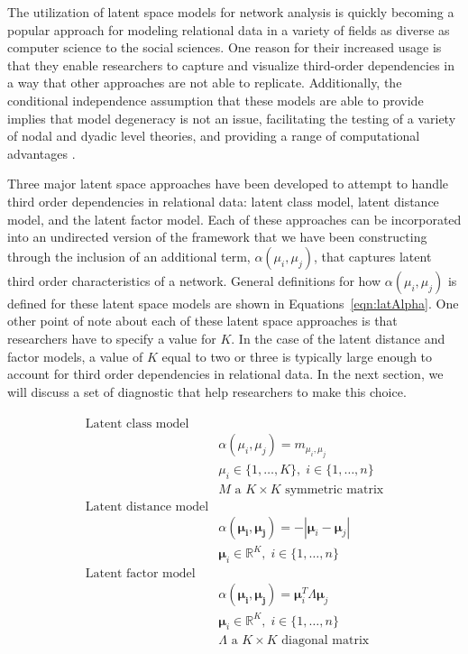 The utilization of latent space models for network analysis is quickly becoming a popular approach for modeling relational data in a variety of fields as diverse as computer science to the social sciences. One   reason for their increased usage is that they enable researchers to capture and visualize third-order dependencies in a way that other approaches are not able to replicate. Additionally, the conditional independence assumption that these models are able to provide implies that model degeneracy is not an issue, facilitating the testing of a variety of nodal and dyadic level theories, and providing a range of computational advantages \citep{hunter:etal:2012}. 

Three major latent space approaches have been developed to attempt to handle third order dependencies in relational data: latent class model, latent distance model, and the latent factor model. Each of these approaches can be incorporated into an undirected version of the framework that we have been constructing through the inclusion of an additional term, $\alpha(\mu_{i}, \mu_{j})$, that captures latent third order characteristics of a network. General definitions for how $\alpha(\mu_{i}, \mu_{j})$ is defined for these latent space models are shown in Equations~\ref{eqn:latAlpha}. One other point of note about each of these latent space approaches is that researchers have to specify a value for $K$. In the case of the latent distance and factor models, a value of $K$ equal to two or three is typically large enough to account for third order dependencies in relational data. In the next section, we will discuss a set of diagnostic that help researchers to make this choice.

\begin{align}
\begin{aligned}
\text{Latent class model} \\
	&\alpha(\mu_{i}, \mu_{j}) = m_{\mu_{i}, \mu_{j}} \\
	&\mu_{i} \in \{1, \ldots, K \}, \; i \in \{1,\ldots, n\} \\
	&M \text{ a } K \times K \text{ symmetric matrix} \\
\text{Latent distance model} \\
	&\alpha(\bm{\mu_{i}}, \bm{\mu_{j}}) = -|\bm\mu_{i} - \bm\mu_{j}| \\
	&\bm\mu_{i} \in \mathbb{R}^{K}, \; i \in \{1, \ldots, n \} \\
\text{Latent factor model} \\
	&\alpha(\bm{\mu_{i}}, \bm{\mu_{j}}) = \bm\mu_{i}^{T} \Lambda \bm\mu_{j} \\
	&\bm\mu_{i} \in \mathbb{R}^{K}, \; i \in \{1, \ldots, n \} \\
	&\Lambda \text{ a } K \times K \text{ diagonal matrix}
\label{eqn:latAlpha}
\end{aligned}
\end{align}

